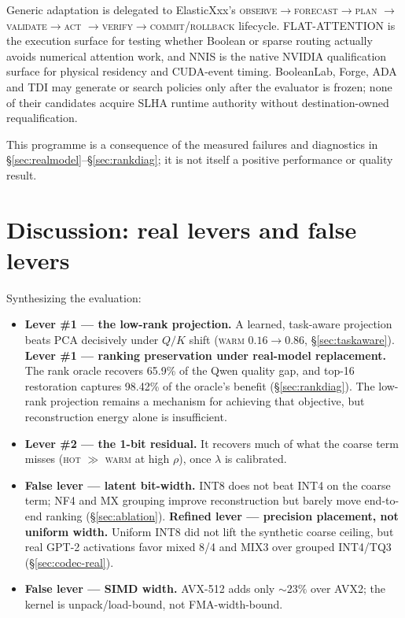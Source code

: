 \documentclass[11pt]{article}
\newcommand{\added}[1]{\textcolor{revisionblue}{#1}}
\newcommand{\deleted}[1]{\textcolor{revisionred}{#1}}
\newenvironment{addedblock}{\begingroup\color{revisionblue}}{\endgroup}
\theoremstyle{plain}
\theoremstyle{definition}
\begin{document}
\begin{addedblock}
Generic adaptation is delegated to ElasticXxx's
\textsc{observe}$\rightarrow$\textsc{forecast}$\rightarrow$\textsc{plan}
$\rightarrow$\textsc{validate}$\rightarrow$\textsc{act}
$\rightarrow$\textsc{verify}$\rightarrow$\textsc{commit}/\textsc{rollback}
lifecycle. FLAT-ATTENTION is the execution surface for testing whether Boolean
or sparse routing actually avoids numerical attention work, and NNIS is the
native NVIDIA qualification surface for physical residency and CUDA-event
timing. BooleanLab, Forge, ADA and TDI may generate or search policies only
after the evaluator is frozen; none of their candidates acquire SLHA runtime
authority without destination-owned requalification.

This programme is a consequence of the measured failures and diagnostics in
\S\ref{sec:realmodel}--\S\ref{sec:rankdiag}; it is not itself a positive
performance or quality result.
\end{addedblock}

\section{Discussion: real levers and false levers}
\label{sec:discussion}
Synthesizing the evaluation:

\begin{itemize}[leftmargin=1.4em,itemsep=2pt]
  \item \deleted{\textbf{Lever \#1 --- the low-rank projection.} A learned,
    task-aware projection beats PCA decisively under $Q/K$ shift
    (\textsc{warm} $0.16 \to 0.86$, \S\ref{sec:taskaware}).}
    \added{\textbf{Lever \#1 --- ranking preservation under real-model
    replacement.} The rank oracle recovers 65.9\% of the Qwen quality gap,
    and top-16 restoration captures 98.42\% of the oracle's benefit
    (\S\ref{sec:rankdiag}). The low-rank projection remains a mechanism for
    achieving that objective, but reconstruction energy alone is insufficient.}
  \item \textbf{Lever \#2 --- the 1-bit residual.} It recovers much of
    what the coarse term misses (\textsc{hot} $\gg$ \textsc{warm} at high
    $\rho$), once $\lambda$ is calibrated.
  \item \deleted{\textbf{False lever --- latent bit-width.} INT8 does not beat
    INT4 on the coarse term; NF4 and MX grouping improve reconstruction
    but barely move end-to-end ranking (\S\ref{sec:ablation}).}
    \added{\textbf{Refined lever --- precision placement, not uniform width.}
    Uniform INT8 did not lift the synthetic coarse ceiling, but real GPT-2
    activations favor mixed 8/4 and MIX3 over grouped INT4/TQ3
    (\S\ref{sec:codec-real}).}
  \item \textbf{False lever --- SIMD width.} AVX-512 adds only
    $\sim\!23\%$ over AVX2; the kernel is unpack/load-bound, not
    FMA-width-bound.
\end{itemize}
\end{document}
